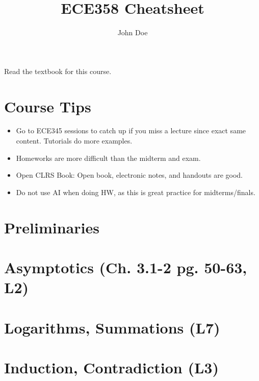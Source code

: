 \documentclass{article}
\title{ECE358 Cheatsheet}
\author{John Doe}
\begin{document}
\maketitle

\tableofcontents

\listoffigures

\listoftables

Read the textbook for this course. 

\section{Course Tips}
\begin{intuition}
    \begin{itemize}
        \item Go to ECE345 sessions to catch up if you miss a lecture since exact same content. Tutorials do more examples. 
        \item Homeworks are more difficult than the midterm and exam.
        \item Open CLRS Book: Open book, electronic notes, and handouts are good. 
        \item Do not use AI when doing HW, as this is great practice for midterms/finals.
    \end{itemize}
\end{intuition}

\section{Preliminaries}

\newpage

\section{Asymptotics (Ch. 3.1-2 pg. 50-63, L2)} 

\newpage

\section{Logarithms, Summations (L7)} %

\newpage

\section{Induction, Contradiction (L3)} %

\newpage
\end{document}
